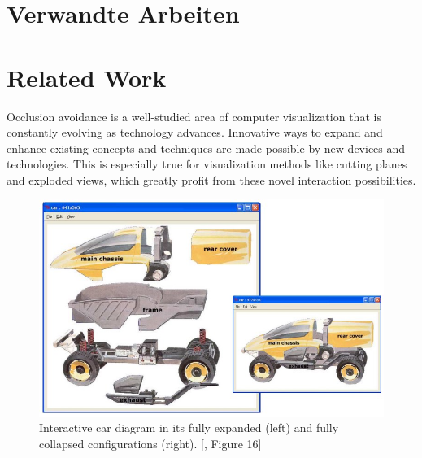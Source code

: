 {\chapter{Verwandte Arbeiten}}
{\chapter{Related Work}}
\label{sec:related}




Occlusion avoidance is a well-studied area of computer visualization that is constantly evolving as technology advances.
Innovative ways to expand and enhance existing concepts and techniques are made possible by new devices and technologies. 
This is especially true for visualization methods like cutting planes and exploded views, which greatly profit from these novel interaction possibilities.
\begin{figure}
	\centering
	\vspace{-0.8cm}
	\includegraphics[width=1\linewidth]{fig/Images/Li_ExplodedView_GI04_fig16}
	\caption[]{Interactive car diagram in its fully expanded (left) and fully collapsed configurations (right). [\cite{li2004interactive}, Figure 16]}
	\label{fig:li_2004}
	\vspace{-1cm}
\end{figure}

